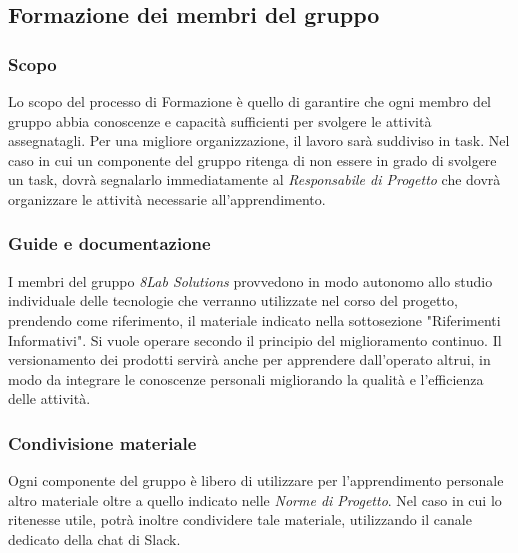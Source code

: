 	\subsection{Formazione dei membri del gruppo}
	\subsubsection{Scopo}
	Lo scopo del processo di Formazione è quello di garantire che ogni membro del gruppo abbia conoscenze e capacità sufficienti per svolgere le attività assegnatagli. Per una migliore organizzazione, il lavoro sarà suddiviso in task. Nel caso in cui un componente del gruppo ritenga di non essere in grado di svolgere un task, dovrà segnalarlo immediatamente al \textit{Responsabile di Progetto} che dovrà organizzare le attività necessarie all'apprendimento.
	\subsubsection{Guide e documentazione}
	I membri del gruppo \textit{8Lab Solutions} provvedono in modo autonomo allo studio individuale delle tecnologie che verranno utilizzate nel corso del  progetto, prendendo  come  riferimento, il  materiale  indicato  nella  sottosezione "Riferimenti Informativi".
	Si vuole operare secondo il principio del miglioramento continuo.
	Il versionamento dei prodotti servirà anche per apprendere dall'operato altrui, in modo da integrare le conoscenze personali migliorando la qualità e l'efficienza delle attività.
	\subsubsection{Condivisione materiale}
	Ogni componente del gruppo è libero di utilizzare per l'apprendimento personale altro materiale oltre a quello indicato nelle \textit{Norme di Progetto}. Nel caso in cui lo ritenesse utile, potrà inoltre condividere tale materiale, utilizzando il canale dedicato della chat di Slack\glo.